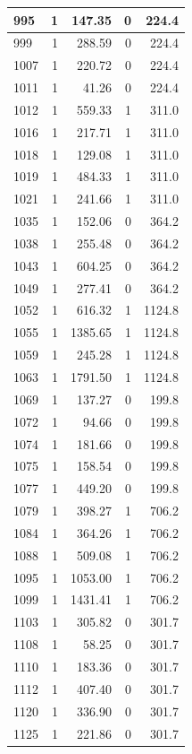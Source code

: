 \documentclass[
  spanish,
  12pt,
]{book}
\begin{document}
\begin{tabular}{l|r|r|r|r}
\hline
995 & 1 & 147.35 & 0 & 224.4\\
\hline
999 & 1 & 288.59 & 0 & 224.4\\
\hline
1007 & 1 & 220.72 & 0 & 224.4\\
\hline
1011 & 1 & 41.26 & 0 & 224.4\\
\hline
1012 & 1 & 559.33 & 1 & 311.0\\
\hline
1016 & 1 & 217.71 & 1 & 311.0\\
\hline
1018 & 1 & 129.08 & 1 & 311.0\\
\hline
1019 & 1 & 484.33 & 1 & 311.0\\
\hline
1021 & 1 & 241.66 & 1 & 311.0\\
\hline
1035 & 1 & 152.06 & 0 & 364.2\\
\hline
1038 & 1 & 255.48 & 0 & 364.2\\
\hline
1043 & 1 & 604.25 & 0 & 364.2\\
\hline
1049 & 1 & 277.41 & 0 & 364.2\\
\hline
1052 & 1 & 616.32 & 1 & 1124.8\\
\hline
1055 & 1 & 1385.65 & 1 & 1124.8\\
\hline
1059 & 1 & 245.28 & 1 & 1124.8\\
\hline
1063 & 1 & 1791.50 & 1 & 1124.8\\
\hline
1069 & 1 & 137.27 & 0 & 199.8\\
\hline
1072 & 1 & 94.66 & 0 & 199.8\\
\hline
1074 & 1 & 181.66 & 0 & 199.8\\
\hline
1075 & 1 & 158.54 & 0 & 199.8\\
\hline
1077 & 1 & 449.20 & 0 & 199.8\\
\hline
1079 & 1 & 398.27 & 1 & 706.2\\
\hline
1084 & 1 & 364.26 & 1 & 706.2\\
\hline
1088 & 1 & 509.08 & 1 & 706.2\\
\hline
1095 & 1 & 1053.00 & 1 & 706.2\\
\hline
1099 & 1 & 1431.41 & 1 & 706.2\\
\hline
1103 & 1 & 305.82 & 0 & 301.7\\
\hline
1108 & 1 & 58.25 & 0 & 301.7\\
\hline
1110 & 1 & 183.36 & 0 & 301.7\\
\hline
1112 & 1 & 407.40 & 0 & 301.7\\
\hline
1120 & 1 & 336.90 & 0 & 301.7\\
\hline
1125 & 1 & 221.86 & 0 & 301.7\\

\end{tabular}
\end{document}

